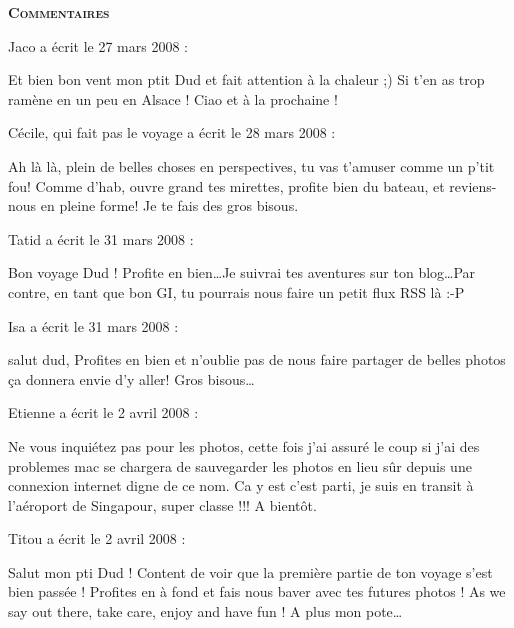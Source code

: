 \bigskip
\textbf{\textsc{Commentaires}}

\medskip
Jaco a écrit le 27 mars 2008 :
\begin{displayquote}
Et bien bon vent mon ptit Dud et fait attention à la chaleur ;) Si t'en as trop ramène en un peu en Alsace !
Ciao et à la prochaine !
\end{displayquote}

\medskip
Cécile, qui fait pas le voyage a écrit le 28 mars 2008 :
\begin{displayquote}
Ah là là, plein de belles choses en perspectives, tu vas t'amuser comme un p'tit fou! Comme d'hab, ouvre grand tes mirettes, profite bien du bateau, et reviens-nous en pleine forme!
Je te fais des gros bisous.
\end{displayquote}

\medskip
Tatid a écrit le 31 mars 2008 :
\begin{displayquote}
Bon voyage Dud ! Profite en bien\dots Je suivrai tes aventures sur ton blog\dots Par contre, en tant que bon GI, tu pourrais nous faire un petit flux RSS là :-P
\end{displayquote}

\medskip
Isa a écrit le 31 mars 2008 :
\begin{displayquote}
salut dud,
Profites en bien et n'oublie pas de nous faire partager de belles photos ça donnera envie d'y aller!
Gros bisous\dots
\end{displayquote}

\medskip
Etienne a écrit le 2 avril 2008 :
\begin{displayquote}
Ne vous inquiétez pas pour les photos, cette fois j'ai assuré le coup si j'ai des problemes mac se chargera de sauvegarder les photos en lieu sûr depuis une connexion internet digne de ce nom.
Ca y est c'est parti, je suis en transit à l'aéroport de Singapour, super classe !!!
A bientôt.
\end{displayquote}

\medskip
Titou a écrit le 2 avril 2008 :
\begin{displayquote}
Salut mon pti Dud ! Content de voir que la première partie de ton voyage s'est bien passée ! Profites en à fond et fais nous baver avec tes futures photos !
As we say out there, take care, enjoy and have fun !
A plus mon pote\dots
\end{displayquote}

\vfill

